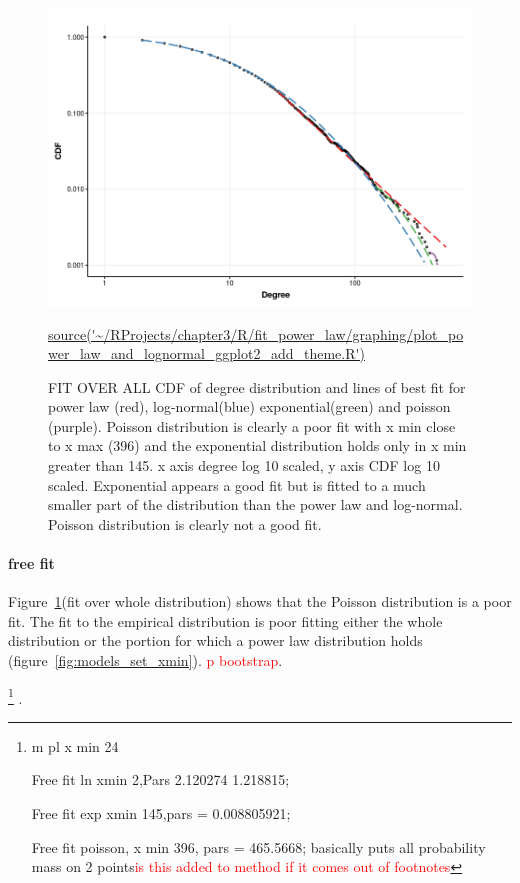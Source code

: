 \begin{figure}
    \centering
    \includegraphics[width=\textwidth]{images/chapter3/poweRlaw/RPlot_plot_powerlaw_xmin_set_for_each_distribution_add_theme.png}
    \caption{FIT OVER ALL CDF of degree distribution and lines of best fit for power law (red), log-normal(blue) exponential(green) and poisson (purple). Poisson distribution is clearly a poor fit with x min close to x max (396) and the exponential distribution holds only in x min greater than 145. x axis degree log 10 scaled, y axis CDF log 10 scaled. Exponential appears a good fit but is fitted to a much smaller part of the distribution than the power law and log-normal. Poisson distribution is clearly not a good fit.} 
    \small\url{source('~/RProjects/chapter3/R/fit_power_law/graphing/plot_power_law_and_lognormal_ggplot2_add_theme.R')}
    \label{fig:CDF degreel_theme}
\end{figure}



\paragraph{free fit}



Figure~\ref{fig:CDF degreel_theme}(fit over whole distribution) shows that the Poisson distribution is a poor fit. The fit to the empirical distribution is poor fitting either the whole distribution or the portion for which a power law distribution holds (figure~\ref{fig:models_set_xmin}). \textcolor{red}{p bootstrap}.



\footnote{m pl x min 24
 
 Free fit ln xmin 2,Pars 2.120274 1.218815;
 
 Free fit exp xmin 145,pars = 0.008805921;
 
 Free fit poisson, x min 396, pars = 465.5668;
  basically puts all probability mass on 2 points\textcolor{red}{is this added to method if it comes out of footnotes}}
  .  

